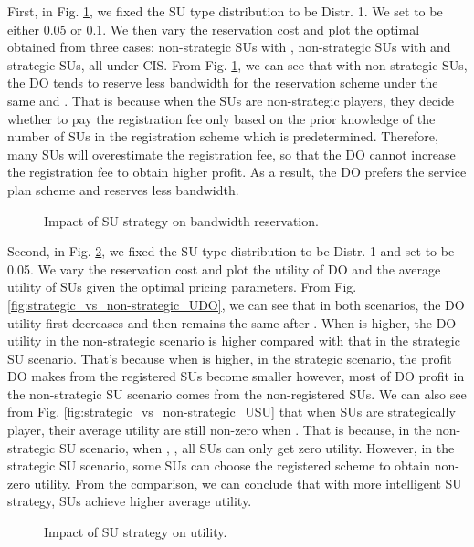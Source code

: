\documentclass[journal]{IEEEtran}
\begin{document}
First, in Fig. \ref{fig:epsilon0-B_R_non-strategic}, we fixed the SU type distribution to be Distr. 1. We set  to be either 0.05 or 0.1. We then vary the reservation cost  and plot the optimal  obtained from three cases: non-strategic SUs with , non-strategic SUs with  and strategic SUs, all under CIS. From Fig. \ref{fig:epsilon0-B_R_non-strategic}, we can see that with non-strategic SUs, the DO tends to reserve less bandwidth for the reservation scheme under the same  and . That is because when the SUs are non-strategic players, they decide whether to pay the registration fee only based on the prior knowledge of the number of SUs in the registration scheme which is predetermined. Therefore, many SUs will overestimate the registration fee, so that the DO cannot increase the registration fee to obtain higher profit. As a result, the DO prefers the service plan scheme and reserves less bandwidth.
\begin{figure}[t]
\centering
\subfloat[.]
{\centering \texttt{[image: epsilon0-B\_R\_non-strategic\_ep1=005.pdf]}         \label{fig:epsilon0-B_R_non-strategic_ep1=0.05}}\subfloat[.]
{\centering\texttt{[image: epsilon0-B\_R\_non-strategic\_ep1=01.pdf]}           \label{fig:epsilon0-B_R_non-strategic_ep1=0.1}}\caption{Impact of SU strategy on bandwidth reservation.}
\label{fig:epsilon0-B_R_non-strategic}
\vspace{-0.0cm}
\end{figure}

Second, in Fig. \ref{fig:strategic_vs_non-strategic}, we fixed the SU type distribution to be Distr. 1 and set  to be 0.05. We vary the reservation cost  and plot the utility of DO and the average utility of SUs given the optimal pricing parameters. From Fig. \ref{fig:strategic_vs_non-strategic_UDO}, we can see that in both scenarios, the DO utility first decreases and then remains the same after . When  is higher, the DO utility in the non-strategic scenario is higher compared with that in the strategic SU scenario. That's because when  is higher, in the strategic scenario, the profit DO makes from the registered SUs become smaller however, most of DO profit in the non-strategic SU scenario comes from the non-registered SUs.
We can also see from Fig. \ref{fig:strategic_vs_non-strategic_USU} that when SUs are strategically player, their average utility are still non-zero when . That is because, in the non-strategic SU scenario, when , , all SUs can only get zero utility. However, in the strategic SU scenario, some SUs can choose the registered scheme to obtain non-zero utility.
From the comparison, we can conclude that with more intelligent SU strategy, SUs achieve higher average utility.
\begin{figure}[t]
\centering
{}\caption{Impact of SU strategy on utility.}
\label{fig:strategic_vs_non-strategic}
\vspace{-0.0cm}
\end{figure}
\end{document}
